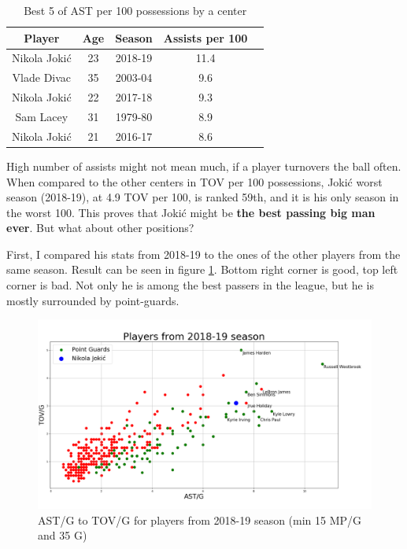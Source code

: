 \documentclass[a4paper]{article}
\begin{document}
\begin{table}[h!]
\begin{center}
\begin{tabular}{|c|c|c|c|c|} \hline
\textbf{Player} & \textbf{Age} & \textbf{Season} & \textbf{Assists per 100} \\ \hline
Nikola Jokić & 23 & 2018-19 & 11.4 \\ \hline
Vlade Divac & 35 & 2003-04 & 9.6 \\ \hline
Nikola Jokić & 22 & 2017-18 & 9.3 \\ \hline
Sam Lacey & 31 & 1979-80 & 8.9 \\ \hline
Nikola Jokić & 21 & 2016-17 & 8.6 \\ \hline
\end{tabular}
\caption{Best 5 of AST per 100 possessions by a center}
\label{tab:centers_ast_per100_top5}
\end{center}
\end{table}

High number of assists might not mean much, if a player turnovers the ball often. When compared to the other centers in TOV per 100 possessions, Joki\' c worst season (2018-19), at 4.9 TOV per 100, is ranked 59th, and it is his only season in the worst 100. This proves that Joki\' c might be \textbf{the best passing big man ever}. But what about other positions?

First, I compared his stats from 2018-19 to the ones of the other players from the same season. Result can be seen in figure \ref{plt:ast_tov_g}. Bottom right corner is good, top left corner is bad. Not only he is among the best passers in the league, but he is mostly surrounded by point-guards.

\begin{figure}[h!]
\begin{center}
\includegraphics[scale=0.30]{ast_tov_g_2019.png}
\end{center}
\caption{AST/G to TOV/G for players from 2018-19 season (min 15 MP/G and 35 G)}
\label{plt:ast_tov_g}
\end{figure}
\end{document}
